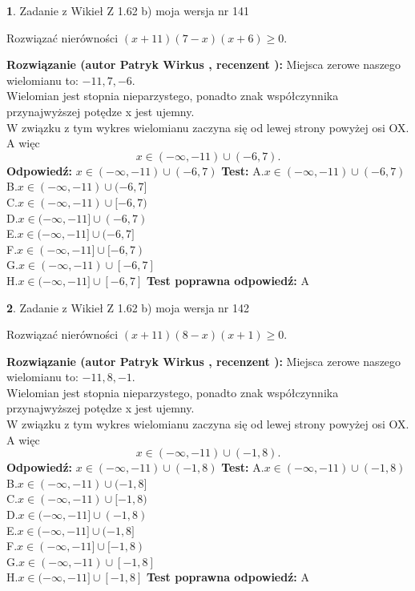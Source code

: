 \documentclass[12pt, a4paper]{article}
\theoremstyle{definition} %
\newtheorem{zad}{}
\newcommand{\zadStart}[1]{\begin{zad}#1\newline}
\newcommand{\zadStop}{\end{zad}}
\newcommand{\rozwStart}[2]{\noindent \textbf{Rozwiązanie (autor #1 , recenzent #2): }\newline}
\newcommand{\rozwStop}{\newline}
\newcommand{\odpStart}{\noindent \textbf{Odpowiedź:}\newline}
\newcommand{\odpStop}{\newline}
\newcommand{\testStart}{\noindent \textbf{Test:}\newline}
\newcommand{\testStop}{\newline}
\newcommand{\kluczStart}{\noindent \textbf{Test poprawna odpowiedź:}\newline}
\newcommand{\kluczStop}{\newline}
\begin{document}
\zadStart{Zadanie z Wikieł Z 1.62 b) moja wersja nr 141}

Rozwiązać nierówności $(x+11)(7-x)(x+6)\ge0$.
\zadStop
\rozwStart{Patryk Wirkus}{}
Miejsca zerowe naszego wielomianu to: $-11, 7, -6$.\\
Wielomian jest stopnia nieparzystego, ponadto znak współczynnika przy\linebreak najwyższej potędze x jest ujemny.\\ W związku z tym wykres wielomianu zaczyna się od lewej strony powyżej osi OX. A więc $$x \in (-\infty,-11) \cup (-6,7).$$
\rozwStop
\odpStart
$x \in (-\infty,-11) \cup (-6,7)$
\odpStop
\testStart
A.$x \in (-\infty,-11) \cup (-6,7)$\\
B.$x \in (-\infty,-11) \cup (-6,7]$\\
C.$x \in (-\infty,-11) \cup [-6,7)$\\
D.$x \in (-\infty,-11] \cup (-6,7)$\\
E.$x \in (-\infty,-11] \cup (-6,7]$\\
F.$x \in (-\infty,-11] \cup [-6,7)$\\
G.$x \in (-\infty,-11) \cup [-6,7]$\\
H.$x \in (-\infty,-11] \cup [-6,7]$
\testStop
\kluczStart
A
\kluczStop



\zadStart{Zadanie z Wikieł Z 1.62 b) moja wersja nr 142}

Rozwiązać nierówności $(x+11)(8-x)(x+1)\ge0$.
\zadStop
\rozwStart{Patryk Wirkus}{}
Miejsca zerowe naszego wielomianu to: $-11, 8, -1$.\\
Wielomian jest stopnia nieparzystego, ponadto znak współczynnika przy\linebreak najwyższej potędze x jest ujemny.\\ W związku z tym wykres wielomianu zaczyna się od lewej strony powyżej osi OX. A więc $$x \in (-\infty,-11) \cup (-1,8).$$
\rozwStop
\odpStart
$x \in (-\infty,-11) \cup (-1,8)$
\odpStop
\testStart
A.$x \in (-\infty,-11) \cup (-1,8)$\\
B.$x \in (-\infty,-11) \cup (-1,8]$\\
C.$x \in (-\infty,-11) \cup [-1,8)$\\
D.$x \in (-\infty,-11] \cup (-1,8)$\\
E.$x \in (-\infty,-11] \cup (-1,8]$\\
F.$x \in (-\infty,-11] \cup [-1,8)$\\
G.$x \in (-\infty,-11) \cup [-1,8]$\\
H.$x \in (-\infty,-11] \cup [-1,8]$
\testStop
\kluczStart
A
\kluczStop
\end{document}

